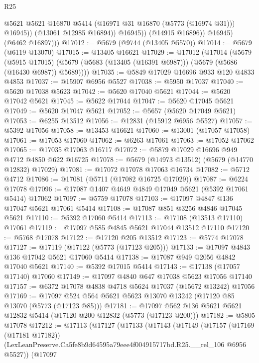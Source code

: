 \begin{lexlean}{R25}
\begin{coremodule}
                      @5621
                      @5621
                      @16870
                      @5414
                      (@16971 @31 @16870 (@5773 (@16974 @31)))
                      @16945))
                  (@13061 @12985 @16894))
                @16945))
            (@14915 @16896))
          @16945)
        (@6462 @16897)))
@17012 := @5679 (@9744 (@13405 @5570))
@17014 := @5679 (@6119 @13070)
@17015 := @13405 @16621
@17029 := @17012
    (@17014
      (@5679
        (@5915 @17015)
        (@5679 (@5683 (@13405 (@16391 @6987))) (@5679 (@5686 (@16430 @6987)) @5689))))
@17035 := @5849 @17029 @16696 @933 @120 @4833 @4853
@17037 := @15907 @6956 @5527
@17038 := @5950 @17037
@17040 := @5620 @17038 @5623
@17042 := @5620 @17040 @5621
@17044 := @5620 @17042 @5621
@17045 := @5622 @17044
@17047 := @5620 @17045 @5621
@17049 := @5620 @17047 @5621
@17052 := @5657 (@5620 @17049 @5621)
@17053 := @6255 @13512
@17056 := @12831 (@15912 @6956 @5527)
@17057 := @5392 @17056
@17058 := @13453 @16621
@17060 := @13001 (@17057 @17058)
@17061 := @17053 @17060
@17062 := @6263 @17061
@17063 := @17052 @17062
@17065 := @17035 @17063 @16717
@17072 := @5879 @17029 @16696 @949 @4712 @4850 @622 @16725
@17078 := @5679 (@14973 @13512) (@5679 (@14770 @12832) @17029)
@17081 := @17072 @17078 @17063 @16734
@17082 := @5712 @4712
@17086 := @17081 (@5711 (@17082 @16725 @17029))
@17087 := @6224 @17078
@17096 := @17087 @1407 @4649 @4849 @17049 @5621 (@5392 @17061 @5414) @17062
@17097 := @5759 @17078
@17103 := @17097 @4847 @136 @17047 @5621 @17061 @5414
@17108 := @17087 @851 @3256 @4846 @17045 @5621
@17110 := @5392 @17060 @5414
@17113 := @17108 (@13513 @17110) @17061
@17119 := @17097 @585 @4845 @5621 @17044 @13512 @17110
@17120 := @5768 @17078
@17122 := @17120 @205 @13512
@17123 := @5774 @17078
@17127 := @17119 (@17122 (@5773 (@17123 @205)))
@17133 := @17097 @4843 @136 @17042 @5621 @17060 @5414
@17138 := @17087 @949 @2056 @4842 @17040 @5621
@17140 := @5392 @17015 @5414
@17143 := @17138 (@17057 @17140) @17060
@17149 := @17097 @4840 @647 @17038 @5623 @17056 @17140
@17157 := @6372 @17078 @4838 @4718 @5624 @17037 (@15672 @13242) @17056
@17169 := @17097 @524 @564 @5621 @5623 @13070 @13242 (@17120 @85 @13070 (@5773 (@17123 @85)))
@17181 := @17097 @562 @136 @5621 @5621 @12832 @5414 (@17120 @200 @12832 (@5773 (@17123 @200)))
@17182 := @5805 @17078
@17212 := @17113
    (@17127
      (@17133
        (@17143
          (@17149
            (@17157
              (@17169 (@17181 @17182))
              (LexLeanPreserve.Ca5fe8b9d64595a79eee4f004915717bd.R25.__rel_106 @6956 @5527))
            (@17097

\end{coremodule}
\end{lexlean}
